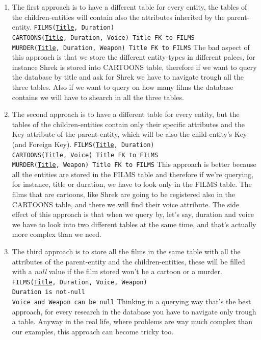 \documentclass[class=book, crop=false, oneside]{standalone}
\newcommand\tab[1][1cm]{\hspace*{#1}}
\begin{document}
\begin{enumerate}
	\item The first approach is to have a different table for every entity, the tables of the children-entities will contain also the attributes inherited by the parent-entity.
	\vskip 5pt
	\texttt{FILMS(\underline{Title}, Duration)}\\
	\texttt{CARTOONS(\underline{Title}, Duration, Voice)   Title FK to FILMS}\\
	\texttt{MURDER(\underline{Title}, Duration, Weapon)   Title FK to FILMS}
	\vskip 5pt
	The bad aspect of this approach is that we store the different entity-types in different palces, for instance Shrek is stored into CARTOONS table, therefore if we want to query the database by title and ask for Shrek we have to navigate trough all the three tables. Also if we want to query on how many films the database contains we will have to shearch in all the three tables.
	\item The second approach is to have a different table for every entity, but the tables of the children-entities contain only their specific attributes and the Key attribute of the parent-entity, which will be also the child-entity's Key (and Foreign Key).
	\vskip 5pt
	\texttt{FILMS(\underline{Title}, Duration)}\\
	\texttt{CARTOONS(\underline{Title}, Voice)   Title FK to FILMS}\\
	\texttt{MURDER(\underline{Title}, Weapon)   Title FK to FILMS}
	\vskip 5pt
	This approach is better because all the entities are stored in the FILMS table and therefore if we're querying, for instance, title or duration, we have to look only in the FILMS table. The films that are cartoons, like Shrek are going to be registered also in the CARTOONS table, and there we will find their voice attribute.
	The side effect of this approach is that when we query by, let's say, duration and voice we have to look into two different tables at the same time, and that's actually more complex than we need.
	\item The third approach is to store all the films in the same table with all the attributes of the parent-entity and the children-entities, these will be filled with a \emph{null} value if the film stored won't be a cartoon or a murder.
	\vskip 5pt
	\texttt{FILMS(\underline{Title}, Duration, Voice, Weapon)}\\
	\tab[.4cm] \texttt{Duration is not-null}\\
	\tab[.4cm] \texttt{Voice and Weapon can be null}
	\vskip 5pt
	Thinking in a querying way that's the best approach, for every research in the database you have to navigate only trough a table. Anyway in the real life, where problems are way much complex than our examples, this approach can become tricky too.
\end{enumerate}
\end{document}
